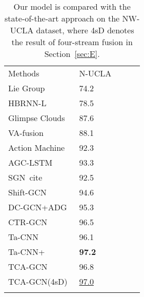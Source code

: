 \documentclass[letterpaper]{article} \usepackage[submission]{aaai23}  \usepackage{times}  \usepackage{helvet}  \usepackage{courier}  \usepackage[hyphens]{url}  \usepackage{graphicx} \urlstyle{rm} \def\UrlFont{\rm}  \usepackage{natbib}  \usepackage{caption} \frenchspacing  \setlength{\pdfpagewidth}{8.5in} \setlength{\pdfpageheight}{11in} \usepackage{algorithm}
\begin{document}
\begin{table}[h]
 \centering
\begin{tabular}{lllll}
\hline\noalign{\smallskip}
Methods & N-UCLA
 \\
\noalign{\smallskip}\hline\noalign{\smallskip}
Lie Group~\citeyearpar{VivekVeeriah2015DifferentialRN}&74.2\\
HBRNN-L~\citeyearpar{2015Hierarchical}&78.5\\
Glimpse Clouds~\citeyearpar{2018Glimpse}&87.6\\
VA-fusion~\citeyearpar{2018View}&88.1\\
Action Machine~\citeyearpar{2018Action}&92.3\\
AGC-LSTM~\citeyearpar{2019An}&93.3\\
SGN~cite~\citeyearpar{2020Semantics}&92.5\\
Shift-GCN~\citeyearpar{2020Skeletonshift}&94.6\\
DC-GCN+ADG~\citeyearpar{2020Decoupling}&95.3\\
CTR-GCN~\citeyearpar{2021Channel}&96.5\\
Ta-CNN~\citeyearpar{xu2022topology}&96.1\\

Ta-CNN+~\citeyearpar{xu2022topology}&{\bf97.2}\\ 
\noalign{\smallskip}\hline
TCA-GCN& 96.8\\
TCA-GCN(4sD)& \underline{97.0}\\


\noalign{\smallskip}\hline
\end{tabular}\caption{Our model is compared with the state-of-the-art approach on the NW-UCLA dataset, where 4sD denotes the result of four-stream fusion in Section~\ref{sec:E}.}
\label{tab:31}
\end{table}
\end{document}
